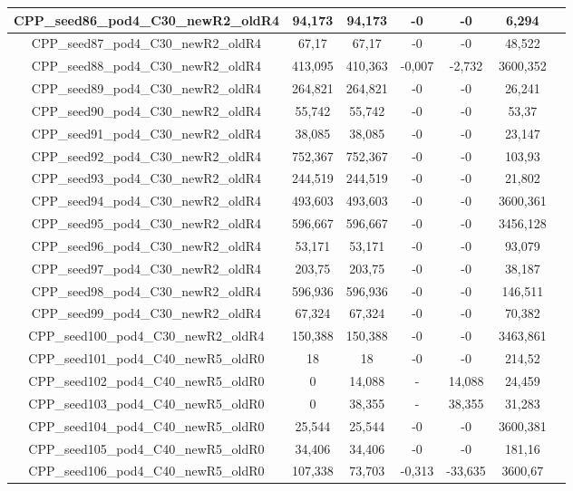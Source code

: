 \documentclass[a4paper]{article}
\begin{document}
\begin{center}
\begin{longtable}{ccccccc}
\hline
CPP\_seed86\_pod4\_C30\_newR2\_oldR4 & 94,173 & 94,173 & -0 & -0 & 6,294\\
\hline
CPP\_seed87\_pod4\_C30\_newR2\_oldR4 & 67,17 & 67,17 & -0 & -0 & 48,522\\
\hline
CPP\_seed88\_pod4\_C30\_newR2\_oldR4 & 413,095 & 410,363 & -0,007 & -2,732 & 3600,352\\
\hline
CPP\_seed89\_pod4\_C30\_newR2\_oldR4 & 264,821 & 264,821 & -0 & -0 & 26,241\\
\hline
CPP\_seed90\_pod4\_C30\_newR2\_oldR4 & 55,742 & 55,742 & -0 & -0 & 53,37\\
\hline
CPP\_seed91\_pod4\_C30\_newR2\_oldR4 & 38,085 & 38,085 & -0 & -0 & 23,147\\
\hline
CPP\_seed92\_pod4\_C30\_newR2\_oldR4 & 752,367 & 752,367 & -0 & -0 & 103,93\\
\hline
CPP\_seed93\_pod4\_C30\_newR2\_oldR4 & 244,519 & 244,519 & -0 & -0 & 21,802\\
\hline
CPP\_seed94\_pod4\_C30\_newR2\_oldR4 & 493,603 & 493,603 & -0 & -0 & 3600,361\\
\hline
CPP\_seed95\_pod4\_C30\_newR2\_oldR4 & 596,667 & 596,667 & -0 & -0 & 3456,128\\
\hline
CPP\_seed96\_pod4\_C30\_newR2\_oldR4 & 53,171 & 53,171 & -0 & -0 & 93,079\\
\hline
CPP\_seed97\_pod4\_C30\_newR2\_oldR4 & 203,75 & 203,75 & -0 & -0 & 38,187\\
\hline
CPP\_seed98\_pod4\_C30\_newR2\_oldR4 & 596,936 & 596,936 & -0 & -0 & 146,511\\
\hline
CPP\_seed99\_pod4\_C30\_newR2\_oldR4 & 67,324 & 67,324 & -0 & -0 & 70,382\\
\hline
CPP\_seed100\_pod4\_C30\_newR2\_oldR4 & 150,388 & 150,388 & -0 & -0 & 3463,861\\
\hline
CPP\_seed101\_pod4\_C40\_newR5\_oldR0 & 18 & 18 & -0 & -0 & 214,52\\
\hline
CPP\_seed102\_pod4\_C40\_newR5\_oldR0 & 0 & 14,088 & - & 14,088 & 24,459\\
\hline
CPP\_seed103\_pod4\_C40\_newR5\_oldR0 & 0 & 38,355 & - & 38,355 & 31,283\\
\hline
CPP\_seed104\_pod4\_C40\_newR5\_oldR0 & 25,544 & 25,544 & -0 & -0 & 3600,381\\
\hline
CPP\_seed105\_pod4\_C40\_newR5\_oldR0 & 34,406 & 34,406 & -0 & -0 & 181,16\\
\hline
CPP\_seed106\_pod4\_C40\_newR5\_oldR0 & 107,338 & 73,703 & -0,313 & -33,635 & 3600,67\\

\end{longtable}
\end{center}
\end{document}
